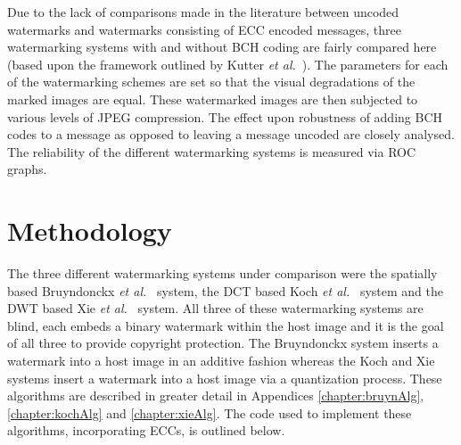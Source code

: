 \documentclass[12pt]{report}
\begin{document}
Due to the lack of comparisons made in the literature between uncoded watermarks and watermarks consisting of ECC encoded messages,
three watermarking systems with and without BCH coding are fairly compared here (based upon the framework outlined by 
Kutter \emph{et al.}~\cite{petit99}).
The parameters for each of the watermarking schemes are set so that the visual degradations of the marked images
are equal. These watermarked images are then subjected to various levels of JPEG compression.
The effect upon robustness of 
adding BCH codes 
to a message as opposed to leaving a message uncoded are closely analysed. The reliability of the different 
watermarking systems is measured via ROC graphs.

\section{Methodology}
\label{sec:withPfp}
The three different watermarking systems under comparison were
the spatially based Bruyndonckx \emph{et al.}~\cite{BKX:bruyn1Pap} system, 
the DCT based Koch \emph{et al.}~\cite{BKX:koch1Pap} system and
the DWT based Xie \emph{et al.}~\cite{BKX:xiePap} system.
All three of these watermarking systems are blind, each embeds a binary watermark within the 
host image and it is the goal of all three to provide copyright protection.
The Bruyndonckx system inserts a watermark into a host image in an additive
fashion whereas the Koch and Xie systems insert a watermark into a host image
via a quantization process. 
These algorithms are described in greater detail
in Appendices \ref{chapter:bruynAlg},  \ref{chapter:kochAlg} and  \ref{chapter:xieAlg}.
The code used to implement these algorithms, incorporating ECCs, is outlined below.
\end{document}
